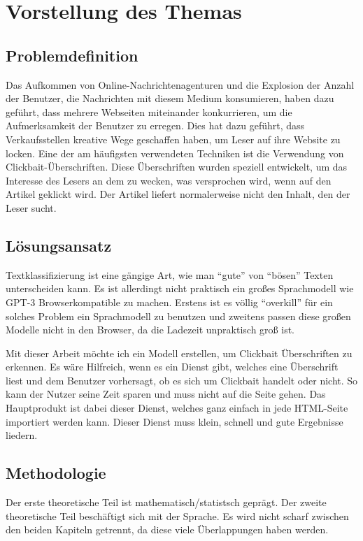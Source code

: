 \chapter{Vorstellung des Themas}
\section{Problemdefinition}
Das Aufkommen von Online-Nachrichtenagenturen und die Explosion der Anzahl der Benutzer, die Nachrichten mit diesem Medium konsumieren, haben dazu geführt, dass mehrere Webseiten miteinander konkurrieren, um die Aufmerksamkeit der Benutzer zu erregen. Dies hat dazu geführt, dass Verkaufsstellen kreative Wege geschaffen haben, um Leser auf ihre Website zu locken. Eine der am häufigsten verwendeten Techniken ist die Verwendung von Clickbait-Überschriften. Diese Überschriften wurden speziell entwickelt, um das Interesse des Lesers an dem zu wecken, was versprochen wird, wenn auf den Artikel geklickt wird. Der Artikel liefert normalerweise nicht den Inhalt, den der Leser sucht. 

\section{Lösungsansatz}
Textklassifizierung ist eine gängige Art, wie man \enquote{gute} von \enquote{bösen} Texten unterscheiden kann. Es ist allerdingt nicht praktisch ein großes Sprachmodell wie GPT-3 Browserkompatible zu machen. Erstens ist es völlig \enquote{overkill} für ein solches Problem ein Sprachmodell zu benutzen und zweitens passen diese großen Modelle nicht in den Browser, da die Ladezeit unpraktisch groß ist.

Mit dieser Arbeit möchte ich ein Modell erstellen, um Clickbait Überschriften zu erkennen. Es wäre Hilfreich, wenn es ein Dienst gibt, welches eine Überschrift liest und dem Benutzer vorhersagt, ob es sich um Clickbait handelt oder nicht. So kann der Nutzer seine Zeit sparen und muss nicht auf die Seite gehen. Das Hauptprodukt ist dabei dieser Dienst, welches ganz einfach in jede HTML-Seite importiert werden kann. Dieser Dienst muss klein, schnell und gute Ergebnisse liedern.

\section{Methodologie}

Der erste theoretische Teil ist mathematisch/statistsch geprägt. Der zweite theoretische Teil beschäftigt sich mit der Sprache. Es wird nicht scharf zwischen den beiden Kapiteln getrennt, da diese viele Überlappungen haben werden.

